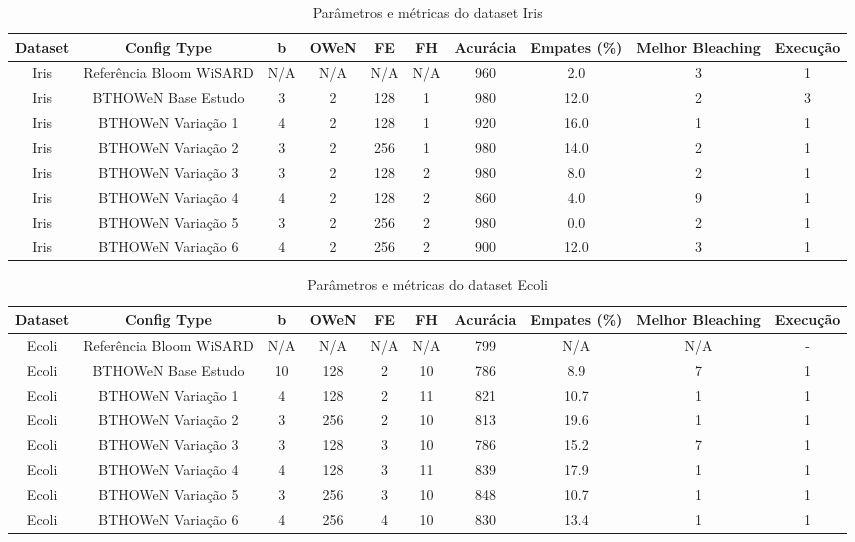\documentclass{article}
\begin{document}
\begin{longtable}{|c|c|c|c|c|c|c|c|c|c|}
\caption{Parâmetros e métricas do dataset Iris} \\
\hline
\textbf{Dataset} & \textbf{Config Type} & \textbf{b} & \textbf{OWeN} & \textbf{FE} & \textbf{FH} & \textbf{Acurácia} & \textbf{Empates (\%)} & \textbf{Melhor Bleaching} & \textbf{Execução} \\
\hline
Iris & Referência Bloom WiSARD & N/A & N/A & N/A & N/A & 960 & 2.0 & 3 & 1 \\
\hline
Iris & BTHOWeN Base Estudo & 3 & 2 & 128 & 1 & 980 & 12.0 & 2 & 3 \\
\hline
Iris & BTHOWeN Variação 1 & 4 & 2 & 128 & 1 & 920 & 16.0 & 1 & 1 \\
\hline
Iris & BTHOWeN Variação 2 & 3 & 2 & 256 & 1 & 980 & 14.0 & 2 & 1 \\
\hline
Iris & BTHOWeN Variação 3 & 3 & 2 & 128 & 2 & 980 & 8.0 & 2 & 1 \\
\hline
Iris & BTHOWeN Variação 4 & 4 & 2 & 128 & 2 & 860 & 4.0 & 9 & 1 \\
\hline
Iris & BTHOWeN Variação 5 & 3 & 2 & 256 & 2 & 980 & 0.0 & 2 & 1 \\
\hline
Iris & BTHOWeN Variação 6 & 4 & 2 & 256 & 2 & 900 & 12.0 & 3 & 1 \\
\hline
\end{longtable}

\begin{longtable}{|c|c|c|c|c|c|c|c|c|c|}
\caption{Parâmetros e métricas do dataset Ecoli} \\
\hline
\textbf{Dataset} & \textbf{Config Type} & \textbf{b} & \textbf{OWeN} & \textbf{FE} & \textbf{FH} & \textbf{Acurácia} & \textbf{Empates (\%)} & \textbf{Melhor Bleaching} & \textbf{Execução} \\
\hline
Ecoli & Referência Bloom WiSARD & N/A & N/A & N/A & N/A & 799 & N/A & N/A & - \\
\hline
Ecoli & BTHOWeN Base Estudo & 10 & 128 & 2 & 10 & 786 & 8.9 & 7 & 1 \\
\hline
Ecoli & BTHOWeN Variação 1 & 4 & 128 & 2 & 11 & 821 & 10.7 & 1 & 1 \\
\hline
Ecoli & BTHOWeN Variação 2 & 3 & 256 & 2 & 10 & 813 & 19.6 & 1 & 1 \\
\hline
Ecoli & BTHOWeN Variação 3 & 3 & 128 & 3 & 10 & 786 & 15.2 & 7 & 1 \\
\hline
Ecoli & BTHOWeN Variação 4 & 4 & 128 & 3 & 11 & 839 & 17.9 & 1 & 1 \\
\hline
Ecoli & BTHOWeN Variação 5 & 3 & 256 & 3 & 10 & 848 & 10.7 & 1 & 1 \\
\hline
Ecoli & BTHOWeN Variação 6 & 4 & 256 & 4 & 10 & 830 & 13.4 & 1 & 1 \\
\hline
\end{longtable}
\end{document}
